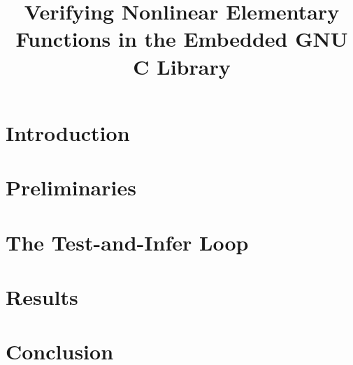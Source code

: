 \documentclass{acm_proc_article-sp}
\begin{document}
\title{Verifying Nonlinear Elementary Functions in the Embedded GNU C Library}

\maketitle
\begin{abstract}

\end{abstract}


\section{Introduction}


\section{Preliminaries}


\section{The Test-and-Infer Loop}


\section{Results}


\section{Conclusion}




\end{document}

